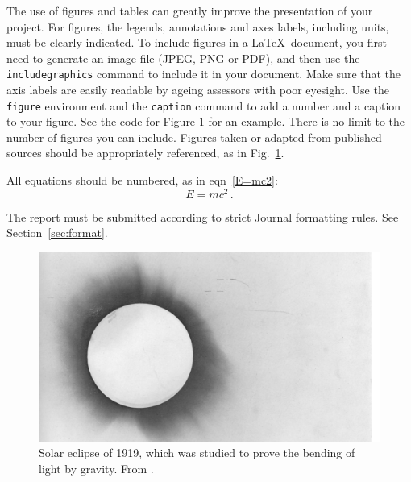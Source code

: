 \documentclass[aps,pra,twocolumn]{revtex4-2}
\begin{document}
 The use of figures and tables can greatly improve the presentation of your project. For figures, the legends, annotations and axes labels, including units, must be clearly indicated. To include figures in a \LaTeX\ document, you first need to generate an image file (JPEG, PNG or PDF), and then use the {\tt includegraphics} command to include it in your document. Make sure that the axis labels are easily readable by ageing assessors with poor eyesight. Use the {\tt figure} environment and the {\tt caption} command to add a number and a caption to your figure. See the code for Figure \ref{fig:eclipse} for an example. There is no limit to the number of figures you can include. 
Figures taken or adapted from published sources should be appropriately referenced, as in Fig.~\ref{fig:eclipse}.

All equations should be numbered, as in eqn~\ref{E=mc2}:
\begin{equation}
\label{E=mc2}
E = mc^2 \, .
\end{equation}



The report must be submitted according to strict Journal formatting rules. See Section~\ref{sec:format}.

\begin{figure}
\includegraphics[width=\columnwidth]{Dyson.jpeg}
\caption{\label{fig:eclipse}Solar eclipse of 1919, which was studied to prove the bending of light by gravity. From \cite{Dyson}.}
\end{figure}

%
\end{document}
